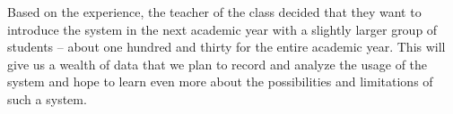 Based on the experience, the teacher of the class decided that they want to introduce the system in the next academic year with a slightly larger group of students -- about one hundred and thirty for the entire academic year. This will give us a wealth of data that we plan to record and analyze the usage of the system and hope to learn even more about the possibilities and limitations of such a system. 

